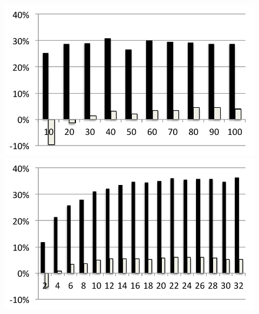 \newcommand\mywidth{0.5 \textwidth}
\begin{figure}
  \includegraphics[width=\mywidth]{../../eval/32threads/case1it.pdf}\includegraphics[width=\mywidth]{../../eval/32threads/case1th.pdf}\\

\end{figure}
